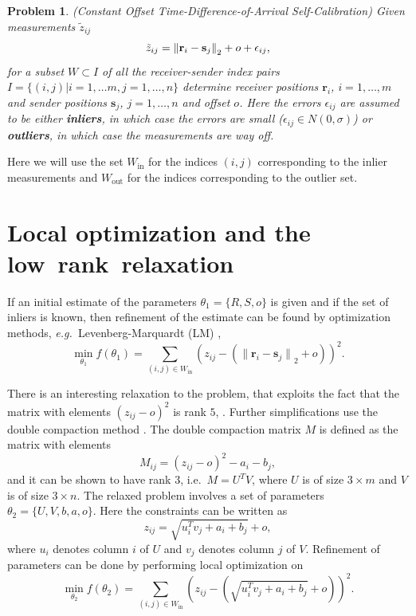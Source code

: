 \documentclass{article}
\providecommand{\norm}[1]{\lVert#1\rVert}
\newtheorem{problem1}{\noindent \textbf{Problem}}
\def\eg{\emph{e.g.\ }}
\def\Win{W_{\text{in}}}
\def\Wout{W_{\text{out}}}
\begin{document}
\noindent \begin{problem1} \label{prob_misstoa}
({{Constant Offset Time-Difference-of-Arrival  Self-Calibration}}) Given measurements $\tilde{z}_{ij}$ 
\vspace{-5pt}
\begin{equation}
\tilde{z}_{ij} = {\norm{\mathbf{r}_i - \mathbf{s}_j}}_2 + o  + \epsilon_{ij}, 
\label{eq:distance}
\vspace{-5pt}
\end{equation}
for a subset $W \subset I$ of all the receiver-sender index pairs $I = \{ (i,j) | i = 1, \ldots m, j = 1, \ldots, n \}$ determine receiver positions $\mathbf{r}_i$, $ i = 1, \dots, m$ and sender positions $\mathbf{s}_j$,  $j = 1, \dots, n$ and offset $o$. 
Here the errors $\epsilon_{ij}$ are assumed to be either 
{\bf inliers}, in which case the errors are small ($\epsilon_{ij} \in N(0,\sigma)$) or {\bf outliers}, in which case the measurements are way off. 
\end{problem1}
Here we will use the set $\Win$ for the indices $(i,j)$ corresponding to the inlier measurements and $\Wout$ for the indices corresponding to the outlier set. 
\vspace{-5pt}
\section{Local optimization and the low~rank~relaxation}
\label{sec:rank}
\vspace{-5pt}
If an initial estimate of the parameters $\theta_1 = \{ R, S, o \}$ is given and if the set of inliers is known, then refinement of the estimate can be found by optimization methods, \eg Levenberg-Marquardt (LM) \cite{levenberg1944method,marquardt1963algorithm}, 
\begin{equation}
\min_{\theta_1} f(\theta_1) = \sum_{(i,j) \in \Win} (z_{ij} - ( {\norm{\mathbf{r}_i - \mathbf{s}_j}}_2 +o) )^2 .
\end{equation}

There is an interesting relaxation to the problem, that exploits the fact that the matrix with elements $ (z_{ij}-o)^2 $ is rank $5$, \cite{pollefeys-nister-icassp-08}. Further simplifications use the double compaction method \cite{kuang2013stratified}. The double compaction matrix $M$ is defined as the matrix with elements
\begin{equation}
M_{ij}=(z_{ij}-o)^2 -a_i-b_j,
\label{eq:dc}
\end{equation}
 and it can be shown to have rank $3$, i.e.\ $M = U^T V$, where $U$ is of size $3 \times m$ and $V$ is of size $3 \times n$. 
The relaxed problem involves a set of parameters
$\theta_2 = \{ U, V, b, a, o \}$. Here the constraints can be written as
\begin{equation}
z_{ij} =  \sqrt{u_i^T v_j + a_i + b_j} + o ,
\end{equation}
where $u_i$ denotes column $i$ of $U$ and $v_j$ denotes column $j$ of $V$.
Refinement of parameters can be done by performing local optimization on 
\begin{equation}
\min_{\theta_2} f(\theta_2) = \sum_{(i,j) \in \Win} \left ( z_{ij} - ( \sqrt{u_i^T v_j + a_i + b_j} + o ) \right )^2 .
\label{eq:relaxed}
\end{equation}
\end{document}
